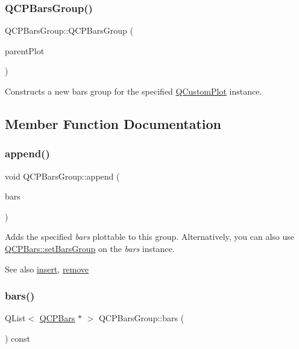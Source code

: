 \subsubsection{\texorpdfstring{Q\+C\+P\+Bars\+Group()}{QCPBarsGroup()}}
{\footnotesize\ttfamily Q\+C\+P\+Bars\+Group\+::\+Q\+C\+P\+Bars\+Group (\begin{DoxyParamCaption}\item[{\hyperlink{class_q_custom_plot}{Q\+Custom\+Plot} $\ast$}]{parent\+Plot }\end{DoxyParamCaption})}

Constructs a new bars group for the specified \hyperlink{class_q_custom_plot}{Q\+Custom\+Plot} instance. 

\subsection{Member Function Documentation}
\mbox{\label{class_q_c_p_bars_group_a809ed63cc4ff7cd5b0b8c96b470163d3}} 
\subsubsection{\texorpdfstring{append()}{append()}}
{\footnotesize\ttfamily void Q\+C\+P\+Bars\+Group\+::append (\begin{DoxyParamCaption}\item[{\hyperlink{class_q_c_p_bars}{Q\+C\+P\+Bars} $\ast$}]{bars }\end{DoxyParamCaption})}

Adds the specified {\itshape bars} plottable to this group. Alternatively, you can also use \hyperlink{class_q_c_p_bars_aedd1709061f0b307c47ddb45e172ef9a}{Q\+C\+P\+Bars\+::set\+Bars\+Group} on the {\itshape bars} instance.

\begin{DoxySeeAlso}{See also}
\hyperlink{class_q_c_p_bars_group_a309a5f7233db189f3ea9c2d04ece6c13}{insert}, \hyperlink{class_q_c_p_bars_group_a215e28a5944f1159013a0e19169220e7}{remove} 
\end{DoxySeeAlso}
\mbox{\label{class_q_c_p_bars_group_a6e4f4e86abbec6a9342f204ef82abef8}} 
\subsubsection{\texorpdfstring{bars()}{bars()}\hspace{0.1cm}{\footnotesize\ttfamily [1/2]}}
{\footnotesize\ttfamily Q\+List$<$ \hyperlink{class_q_c_p_bars}{Q\+C\+P\+Bars} $\ast$ $>$ Q\+C\+P\+Bars\+Group\+::bars (\begin{DoxyParamCaption}{ }\end{DoxyParamCaption}) const\hspace{0.3cm}{\ttfamily [inline]}}

